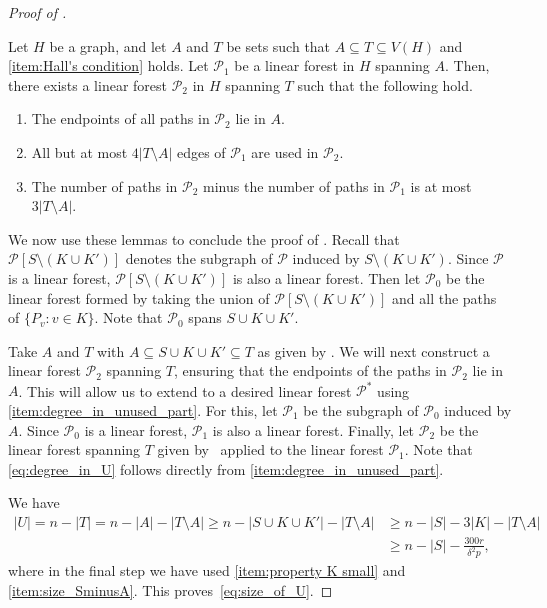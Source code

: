 \documentclass[10pt,a4paper,reqno]{amsart}
\begin{document}
\begin{proof}[Proof of ]
\begin{lemma}\label{lem:Hall_to_extend_paths}
    Let $H$ be a graph, and let $A$ and $T$ be sets such that $A\subseteq T\subseteq V(H)$ and \ref{item:Hall's condition} holds. Let $\mathcal{P}_1$ be a linear forest in $H$ spanning $A$.
    Then, there exists a linear forest $\mathcal{P}_2$ in $H$ spanning $T$ such that the following hold.
    \begin{enumerate}[leftmargin=*,label = {\bfseries D\arabic{enumi}}]
        \item The endpoints of all paths in $\mathcal{P}_2$ lie in $A$. \label{eq:endpoints_in_R}
        \item All but at most $4|T \setminus A|$ edges of $\mathcal{P}_1$ are used in $\mathcal{P}_2$.
        \label{item:few edges left}
        \item The number of paths in $\mathcal{P}_2$ minus the number of paths in $\mathcal{P}_1$ is at most $3|T\setminus A|$.
        \label{item:few paths added}
    \end{enumerate}
\end{lemma}
We now use these lemmas to conclude the proof of . Recall that $\mathcal{P}[S \setminus (K \cup K')]$ denotes the subgraph of $\mathcal{P}$ induced by $S \setminus (K \cup K')$. Since $\mathcal{P}$ is a linear forest, $\mathcal{P}[S \setminus (K \cup K')]$ is also a linear forest. Then let $\mathcal{P}_0$ be the linear forest formed by taking the union of $\mathcal{P}[S \setminus (K \cup K')]$ and all the paths of $\{P_v:v\in K\}$. Note that $\mathcal{P}_0$ spans $S \cup K \cup K'$.

Take $A$ and $T$ with $A\subseteq S\cup K \cup K'\subseteq T$ as given by . We will next construct a linear forest $\mathcal{P}_2$ spanning $T$, ensuring that the endpoints of the paths in $\mathcal{P}_2$ lie in $A$. This will allow us to extend to a desired linear forest $\mathcal{P}^*$ using \ref{item:degree_in_unused_part}. For this, let $\mathcal{P}_1$ be the subgraph of $\mathcal{P}_0$ induced by $A$. Since $\mathcal{P}_0$ is a linear forest, $\mathcal{P}_1$ is also a linear forest.
Finally, let $\mathcal{P}_2$ be the linear forest spanning $T$ given by~ applied to the linear forest $\mathcal{P}_1$. 
Note that \ref{eq:degree_in_U} follows directly from \ref{item:degree_in_unused_part}.

We have
\begin{align*}
    |U| = n - |T| = n - |A| - |T\setminus A| \ge n - |S \cup K \cup K'| - |T\setminus A|
    &\ge n - |S| - 3|K| - |T\setminus A| \\
    &\ge n - |S| - \frac{300r}{\delta^2 p},
\end{align*}
where in the final step we have used \ref{item:property K small} and \ref{item:size_SminusA}. This proves~\ref{eq:size_of_U}.


\end{proof}
\end{document}
